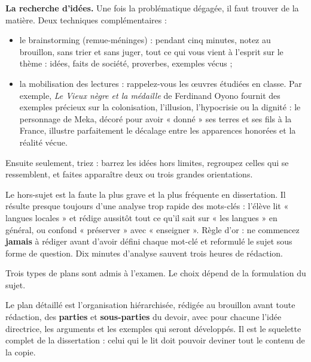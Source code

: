 \documentclass[11pt]{article}
\newcommand{\cle}[1]{{\popxbold\color{popdark}#1}}
\newcounter{popsec}
\newcounter{popsub}
\newcommand{\courssub}[1]{%
  \stepcounter{popsub}%
  \par\vspace{9pt}\noindent{\popxbold\fontsize{11.5}{13}\selectfont\color{popink}{\color{poporange}\thepopsec.\thepopsub}\hspace{6pt}#1}\par\nopagebreak\vspace{4pt}
}
\begin{document}
\textbf{La recherche d'idées.} Une fois la problématique dégagée, il faut trouver de la matière. Deux techniques complémentaires :
\begin{itemize}
\item le \cle{brainstorming} (remue-méninges) : pendant cinq minutes, notez au brouillon, sans trier et sans juger, tout ce qui vous vient à l'esprit sur le thème : idées, faits de société, proverbes, exemples vécus ;
\item la \cle{mobilisation des lectures} : rappelez-vous les œuvres étudiées en classe. Par exemple, \emph{Le Vieux nègre et la médaille} de Ferdinand Oyono fournit des exemples précieux sur la colonisation, l'illusion, l'hypocrisie ou la dignité : le personnage de Meka, décoré pour avoir « donné » ses terres et ses fils à la France, illustre parfaitement le décalage entre les apparences honorées et la réalité vécue.
\end{itemize}
Ensuite seulement, triez : barrez les idées hors limites, regroupez celles qui se ressemblent, et faites apparaître deux ou trois grandes orientations.

\begin{attention}
Le \cle{hors-sujet} est la faute la plus grave et la plus fréquente en dissertation. Il résulte presque toujours d'une analyse trop rapide des mots-clés : l'élève lit « langues locales » et rédige aussitôt tout ce qu'il sait sur « les langues » en général, ou confond « préserver » avec « enseigner ». Règle d'or : ne commencez \textbf{jamais} à rédiger avant d'avoir défini chaque mot-clé et reformulé le sujet sous forme de question. Dix minutes d'analyse sauvent trois heures de rédaction.
\end{attention}

\courssub{Choisir le type de plan}

Trois types de plans sont admis à l'examen. Le choix dépend de la formulation du sujet.

\begin{definition}
Le \cle{plan détaillé} est l'organisation hiérarchisée, rédigée au brouillon avant toute rédaction, des \textbf{parties} et \textbf{sous-parties} du devoir, avec pour chacune l'\cle{idée directrice}, les \cle{arguments} et les \cle{exemples} qui seront développés. Il est le squelette complet de la dissertation : celui qui le lit doit pouvoir deviner tout le contenu de la copie.
\end{definition}
\end{document}
